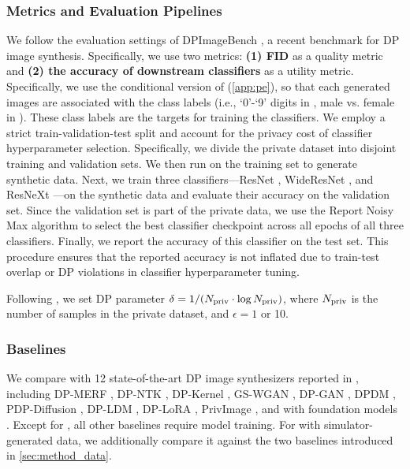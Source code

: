 \subsubsection{Metrics and Evaluation Pipelines}

We follow the evaluation settings of DPImageBench \cite{dpimagebench}, a recent benchmark for DP image synthesis. Specifically, we use two metrics: \textbf{(1) FID} \cite{heusel2017gans} as a quality metric and \textbf{(2) the accuracy of downstream classifiers} as a utility metric.
Specifically, %
we use the conditional version of \pe{} (\cref{app:pe}), 
so that each generated images are associated with the class labels (i.e., `0'-`9' digits in \mnist{}, male vs. female in \celeba{}). 
These class labels are the targets for training the classifiers.
We employ a strict train-validation-test split and account for the privacy cost of classifier hyperparameter selection. Specifically, we divide the private dataset into disjoint training and validation sets. We then run \simpe{} on the training set to generate synthetic data. Next, we train three classifiers—ResNet \cite{he2016deep}, WideResNet \cite{zagoruyko2016wide}, and ResNeXt \cite{xie2017aggregated}—on the synthetic data and evaluate their accuracy on the validation set. Since the validation set is part of the private data, we use the Report Noisy Max algorithm \cite{dwork2014algorithmic} to select the best classifier checkpoint across all epochs of all three classifiers. Finally, we report the accuracy of this classifier on the test set.
This procedure ensures that the reported accuracy is not inflated due to train-test overlap or DP violations in classifier hyperparameter tuning.

Following \citet{dpimagebench}, we set DP parameter $\delta=1/(N_{\mathrm{priv}}\cdot\log N_{\mathrm{priv}})$, where $N_{\mathrm{priv}}$ is the number of samples in the private dataset, and $\epsilon=1$ or 10.



\subsubsection{Baselines}
We compare \simpe{} with 12 state-of-the-art DP image synthesizers reported in \citet{dpimagebench}, including DP-MERF \cite{dp-merf}, DP-NTK \cite{dp-ntk}, DP-Kernel \cite{dp-kernel}, GS-WGAN \cite{gs-wgan}, DP-GAN \cite{dpgan}, DPDM \cite{dpdm}, PDP-Diffusion \cite{dp-diffusion}, DP-LDM \cite{dpldm}, DP-LoRA \cite{dplora}, PrivImage \cite{li2023privimage}, and \pe{} with foundation models \cite{lin2023differentially}. Except for \pe{}, all other baselines require model training.
For \simpe{} with simulator-generated data, we additionally compare it against the two baselines introduced in \cref{sec:method_data}.

